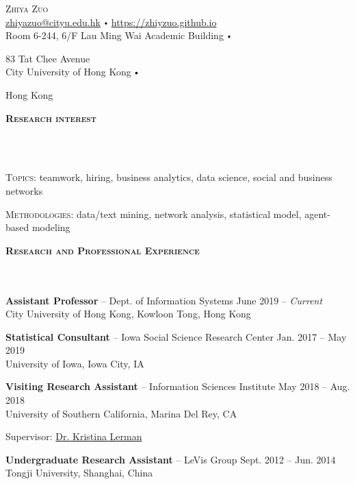 \documentclass{article}
\newcommand{\contact}[3]{
\vspace*{5pt}
\begin{center}
{\LARGE \scshape {#1}}\\
\vspace{3pt}
#2 
\vspace{2pt}
#3
\end{center}
\vspace*{-8pt}
}
\newcommand{\header}[1]{{
\hspace*{-15pt}\vspace*{6pt} \textbf{\textsc{\large{#1}}}} \vspace*{-6pt} 
\lineunder
}
\newcommand{\lineunder}{
\vspace*{-8pt} \\ \hspace*{-15pt} 
\hrulefill \\
}
\newcommand{\employer}[4]{{
\vspace*{2pt}%
\textbf{#1} #2 \hfill #3\\ #4 \vspace*{2pt}}
}
\renewcommand{\labelitemi}{
$\vcenter{\hbox{\tiny$\bullet$}}$\hspace*{3pt}
}
\renewcommand{\labelitemii}{
$\vcenter{\hbox{\tiny$\bullet$}}$\hspace*{-3pt}
}
\newenvironment{bullet-list-major}{
\begin{list}{\labelitemii}{\setlength\leftmargin{3pt} 
\topsep 0pt \itemsep -2pt}}{\vspace*{4pt}\end{list}
}
\newenvironment{bullet-list-minor}{
\begin{list}{\labelitemii}{\setlength\leftmargin{15pt} 
\topsep 0pt \itemsep -2pt}}{\vspace*{4pt}\end{list}
}
\begin{document}
\small
\smallskip
\vspace*{-44pt}

\contact{Zhiya Zuo}
{\href{mailto:zhiyazuo@cityu.edu.hk}{zhiyazuo@cityu.edu.hk} \labelitemi \href{https://zhiyzuo.github.io}{https://zhiyzuo.github.io}\\}
{Room 6-244, 6/F Lau Ming Wai Academic Building \labelitemi
83 Tat Chee Avenue \\
City University of Hong Kong \labelitemi 
Hong Kong 
}

\thispagestyle{firstpage}

\vspace{15pt}
\header{Research interest}
\begin{bullet-list-major}
    \item \textsc{Topics}: teamwork, hiring, business analytics, data science, social and business networks
    \item \textsc{Methodologies}: data/text mining, network analysis, statistical model, agent-based modeling
\end{bullet-list-major}

\vspace*{4pt}
\header{Research and Professional Experience}
    \employer{Assistant Professor}{-- Dept. of Information Systems}{June 2019 -- \textit{Current}}{City University of Hong Kong, Kowloon Tong, Hong Kong}
    \vspace*{4pt}
    
    \employer{Statistical Consultant}{-- Iowa Social Science Research Center}{Jan. 2017 -- May 2019}{University of Iowa, Iowa City, IA}
    \vspace*{4pt}

    \employer{Visiting Research Assistant}{-- Information Sciences Institute}{May 2018 -- Aug. 2018}{University of Southern California, Marina Del Rey, CA}
	\begin{bullet-list-minor}
        \item Supervisor: \href{www.isi.edu/~lerman/}{Dr. Kristina Lerman}
    \end{bullet-list-minor}
    
    \employer{Undergraduate Research Assistant}{-- LeVis Group}{Sept. 2012 -- Jun. 2014}{Tongji University, Shanghai, China}
    
\end{document}
